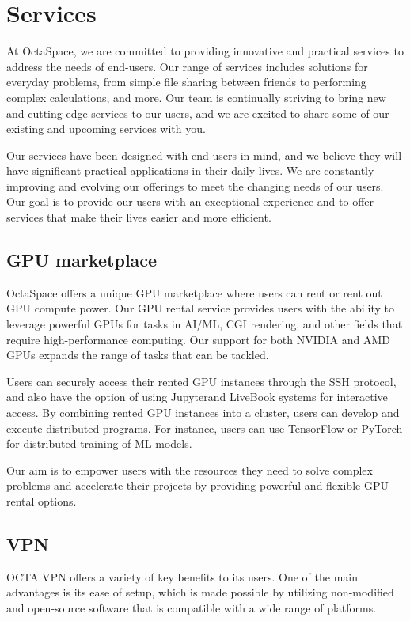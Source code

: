 \section{Services}

At OctaSpace, we are committed to providing innovative and practical services to address the needs of end-users. Our range of services includes solutions for everyday problems, from simple file sharing between friends to performing complex calculations, and more. Our team is continually striving to bring new and cutting-edge services to our users, and we are excited to share some of our existing and upcoming services with you.

Our services have been designed with end-users in mind, and we believe they will have significant practical applications in their daily lives. We are constantly improving and evolving our offerings to meet the changing needs of our users. Our goal is to provide our users with an exceptional experience and to offer services that make their lives easier and more efficient.

\subsection{GPU marketplace}

OctaSpace offers a unique GPU marketplace where users can rent or rent out GPU compute power. Our GPU rental service provides users with the ability to leverage powerful GPUs for tasks in AI/ML, CGI rendering, and other fields that require high-performance computing. Our support for both NVIDIA and AMD GPUs expands the range of tasks that can be tackled.

Users can securely access their rented GPU instances through the SSH protocol, and also have the option of using Jupyter\cite{jupyter}and LiveBook\cite{livebook} systems for interactive access. By combining rented GPU instances into a cluster, users can develop and execute distributed programs. For instance, users can use TensorFlow or PyTorch for distributed training of ML models. 

Our aim is to empower users with the resources they need to solve complex problems and accelerate their projects by providing powerful and flexible GPU rental options.

\subsection{VPN}

OCTA VPN\cite{VPN} offers a variety of key benefits to its users.
One of the main advantages is its ease of setup, which is made possible by utilizing non-modified and open-source software that is compatible with a wide range of platforms.

